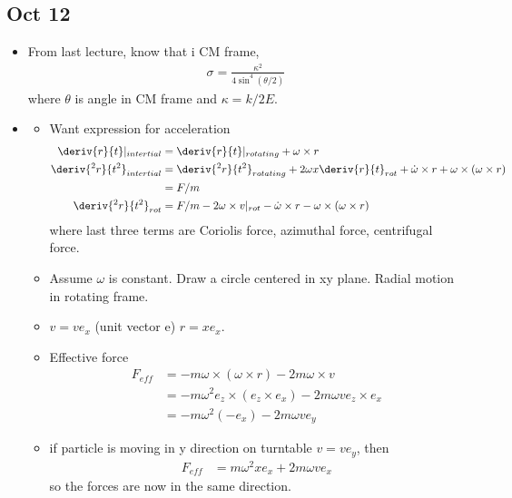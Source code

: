 \documentclass[10pt, twocolumn]{article}
\begin{document}
\newpage
\subsection{Oct 12}
\begin{itemize}
	\item From last lecture, know that i CM frame, 
	\begin{align}
		\sigma = \frac{\kappa^2}{4 \sin^4(\theta/2)}
	\end{align}
	where $\theta$ is angle in CM frame and $\kappa = k/2E$. 
	
	\item {}
	\begin{itemize}
		\item Want expression for acceleration
		\begin{align}
		 \deriv{r}{t}|_{intertial} &=  \deriv{r}{t}|_{rotating} + \omega \times r \\
		 \deriv{^2 r}{t^2}_{intertial} &= \deriv{^2 r}{t^2}_{rotating} + 2 \omega x \deriv{ r}{t}_{rot}  + \dot{\omega} \times r + \omega \times (\omega \times r) \\
		 &= F/m \\
		 \deriv{^2 r}{t^2}_{rot}&= F/m - 2 \omega \times v|_{rot} - \dot{\omega} \times r - \omega \times (\omega \times r) 
		 \end{align}
		 where last three terms are Coriolis force, azimuthal force, centrifugal force. 
	\end{itemize}
	
	\begin{itemize}
		\item Assume $\omega$ is constant. Draw a circle centered in xy plane. Radial motion in rotating frame.
		\item $v = v e_x$ (unit vector e) $r = x e_x$. 
		\item Effective force
		\begin{align}
			F_{eff} &= -m \omega \times (\omega \times r) - 2m \omega \times v \\
			&= -m\omega^2 e_z \times ( e_z \times e_x) - 2m \omega v e_z \times e_x \\
			&= -m\omega^2 (-e_x) - 2m\omega v e_y 
		\end{align}
		
		\item if particle is moving in y direction on turntable $v = v e_y$, then
		\begin{align}
			F_{eff} &= m \omega^2 x e_x + 2 m \omega v e_x
		\end{align}
		so the forces are now in the same direction. 
	\end{itemize}
	

\end{itemize}
\end{document}
